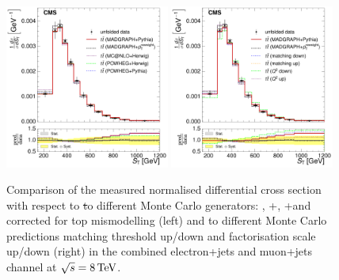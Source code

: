 \begin{figure}[hbtp]
    \centering
     \includegraphics[width=0.48\textwidth]{Chapters/04_Analysis/04b_XSections/images/results/8TeV/ST/central/normalised_xsection_combined_different_generators.pdf}\hfill
     \includegraphics[width=0.48\textwidth]{Chapters/04_Analysis/04b_XSections/images/results/8TeV/ST/central/normalised_xsection_combined_systematics_shifts.pdf}\hfill
     \caption{Comparison of the measured normalised differential cross section with respect to \st to
     different Monte Carlo generators: \MADGRAPH, \POWHEG+\HERWIG, \POWHEG+\PYTHIA and \MADGRAPH corrected for
     top \pt mismodelling (left) and to different Monte Carlo predictions matching threshold up/down and
     factorisation scale up/down (right) in the combined electron+jets and muon+jets channel at
     $\sqrt{s}=8\,\text{Te\hspace{-.08em}V}$.}
     \label{fig:result_ST_8TeV_combined}
\end{figure}

